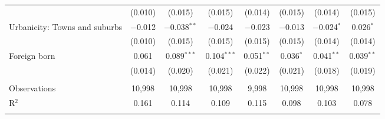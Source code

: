 \begin{tabular}{@{\extracolsep{5pt}}lccccccc}
  & (0.010) & (0.015) & (0.015) & (0.014) & (0.015) & (0.014) & (0.015) \\ 
  Urbanicity: Towns and suburbs & $-$0.012 & $-$0.038$^{**}$ & $-$0.024 & $-$0.023 & $-$0.013 & $-$0.024$^{*}$ & 0.026$^{*}$ \\ 
  & (0.010) & (0.015) & (0.015) & (0.015) & (0.015) & (0.014) & (0.014) \\ 
  Foreign born & 0.061 & 0.089$^{***}$ & 0.104$^{***}$ & 0.051$^{**}$ & 0.036$^{*}$ & 0.041$^{**}$ & 0.039$^{**}$ \\ 
  & (0.014) & (0.020) & (0.021) & (0.022) & (0.021) & (0.018) & (0.019) \\ 
 \hline \\[-1.8ex] 

Observations & 10,998 & 10,998 & 10,998 & 9,998 & 10,998 & 10,998 & 10,998 \\ 
R$^{2}$ & 0.161 & 0.114 & 0.109 & 0.115 & 0.098 & 0.103 & 0.078 \\ 
\hline 
\hline \\[-1.8ex] 
\end{tabular} 